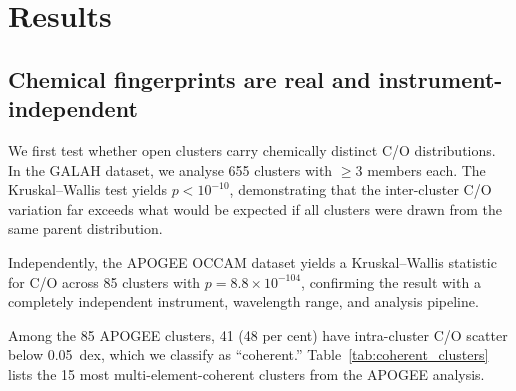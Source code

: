 \documentclass[fleqn,usenatbib]{mnras}
\newcommand{\co}{C/O\xspace}
\begin{document}
\section{Results}
\label{sec:results}

\subsection{Chemical fingerprints are real and instrument-independent}
\label{sec:reality}

We first test whether open clusters carry chemically distinct \co distributions.
In the GALAH dataset, we analyse 655 clusters with $\geq 3$ members each.
The Kruskal--Wallis test yields $p < 10^{-10}$, demonstrating that the inter-cluster \co variation far exceeds what would be expected if all clusters were drawn from the same parent distribution.

Independently, the APOGEE OCCAM dataset yields a Kruskal--Wallis statistic for \co across 85 clusters with $p = 8.8 \times 10^{-104}$, confirming the result with a completely independent instrument, wavelength range, and analysis pipeline.

Among the 85 APOGEE clusters, 41 (48 per cent) have intra-cluster \co scatter below 0.05~dex, which we classify as ``coherent.''
Table~\ref{tab:coherent_clusters} lists the 15 most multi-element-coherent clusters from the APOGEE analysis.
\end{document}
